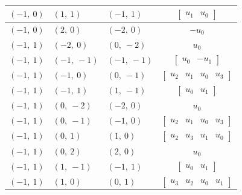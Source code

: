 \documentclass[11pt]{article}
\theoremstyle{definition}
\begin{document}
\begin{longtable}{|l|l|l|c|}
    \hline
    $\left( -1, \  0\right)$ & $\left( 1, \  1\right)$ & $\left( -1, \  1\right)$ & $\left[\begin{matrix}u_{1} & u_{0}\end{matrix}\right]$ \\
    \hline
    $\left( -1, \  0\right)$ & $\left( 2, \  0\right)$ & $\left( -2, \  0\right)$ & $- u_{0}$ \\
    \hline
    $\left( -1, \  1\right)$ & $\left( -2, \  0\right)$ & $\left( 0, \  -2\right)$ & $u_{0}$ \\
    \hline
    $\left( -1, \  1\right)$ & $\left( -1, \  -1\right)$ & $\left( -1, \  -1\right)$ & $\left[\begin{matrix}u_{0} & - u_{1}\end{matrix}\right]$ \\
    \hline
    $\left( -1, \  1\right)$ & $\left( -1, \  0\right)$ & $\left( 0, \  -1\right)$ & $\left[\begin{matrix}u_{2} & u_{1} & u_{0} & u_{3}\end{matrix}\right]$ \\
    \hline
    $\left( -1, \  1\right)$ & $\left( -1, \  1\right)$ & $\left( 1, \  -1\right)$ & $\left[\begin{matrix}u_{0} & u_{1}\end{matrix}\right]$ \\
    \hline
    $\left( -1, \  1\right)$ & $\left( 0, \  -2\right)$ & $\left( -2, \  0\right)$ & $u_{0}$ \\
    \hline
    $\left( -1, \  1\right)$ & $\left( 0, \  -1\right)$ & $\left( -1, \  0\right)$ & $\left[\begin{matrix}u_{2} & u_{1} & u_{0} & u_{3}\end{matrix}\right]$ \\
    \hline
    $\left( -1, \  1\right)$ & $\left( 0, \  1\right)$ & $\left( 1, \  0\right)$ & $\left[\begin{matrix}u_{2} & u_{3} & u_{1} & u_{0}\end{matrix}\right]$ \\
    \hline
    $\left( -1, \  1\right)$ & $\left( 0, \  2\right)$ & $\left( 2, \  0\right)$ & $u_{0}$ \\
    \hline
    $\left( -1, \  1\right)$ & $\left( 1, \  -1\right)$ & $\left( -1, \  1\right)$ & $\left[\begin{matrix}u_{0} & u_{1}\end{matrix}\right]$ \\
    \hline
    $\left( -1, \  1\right)$ & $\left( 1, \  0\right)$ & $\left( 0, \  1\right)$ & $\left[\begin{matrix}u_{3} & u_{2} & u_{0} & u_{1}\end{matrix}\right]$ \\

\end{longtable}
\end{document}

